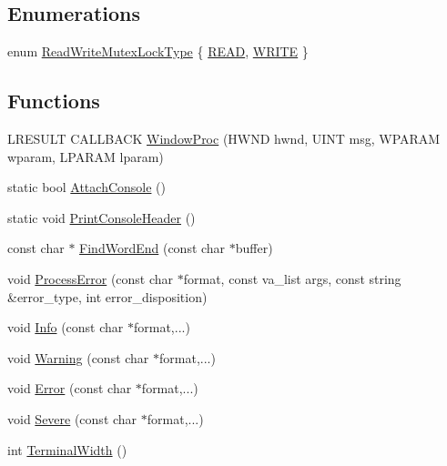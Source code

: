 \subsection*{Enumerations}
\begin{DoxyCompactItemize}
\item 
enum \hyperlink{namespacemage_afd76fcca37ce5c5b2227671290973c74}{Read\+Write\+Mutex\+Lock\+Type} \{ \hyperlink{namespacemage_afd76fcca37ce5c5b2227671290973c74a384918b13691984406aeb754f1c454d0}{R\+E\+AD}, 
\hyperlink{namespacemage_afd76fcca37ce5c5b2227671290973c74aff9d196f4bda4079f3f1ce90bd644662}{W\+R\+I\+TE}
 \}
\end{DoxyCompactItemize}
\subsection*{Functions}
\begin{DoxyCompactItemize}
\item 
L\+R\+E\+S\+U\+LT C\+A\+L\+L\+B\+A\+CK \hyperlink{namespacemage_a327147b1d76dcb41c17c23f9603d80c1}{Window\+Proc} (H\+W\+ND hwnd, U\+I\+NT msg, W\+P\+A\+R\+AM wparam, L\+P\+A\+R\+AM lparam)
\item 
static bool \hyperlink{namespacemage_a720768843a1d752ebf061e1475fa004f}{Attach\+Console} ()
\item 
static void \hyperlink{namespacemage_afb64e5bf4755b0a56a7b0d086bc5f4be}{Print\+Console\+Header} ()
\item 
const char $\ast$ \hyperlink{namespacemage_ab2e62d950dc620167f4128cb16033998}{Find\+Word\+End} (const char $\ast$buffer)
\item 
void \hyperlink{namespacemage_a958c4a88b6cd58f950e1c9b9e46f6906}{Process\+Error} (const char $\ast$format, const va\+\_\+list args, const string \&error\+\_\+type, int error\+\_\+disposition)
\item 
void \hyperlink{namespacemage_add6aa5f13960ce07b20f48d273956a91}{Info} (const char $\ast$format,...)
\item 
void \hyperlink{namespacemage_a0eccd8065c75d5f2bf86b48a5be3bfe5}{Warning} (const char $\ast$format,...)
\item 
void \hyperlink{namespacemage_a52a7fe8c9ce39afd9e0b0299373db0fa}{Error} (const char $\ast$format,...)
\item 
void \hyperlink{namespacemage_a95c8b0820c579bbde59062fd9d05e4f4}{Severe} (const char $\ast$format,...)
\item 
int \hyperlink{namespacemage_a0c12a51bf3468b372932ffc1138a4ddc}{Terminal\+Width} ()
\item 

\end{DoxyCompactItemize}
